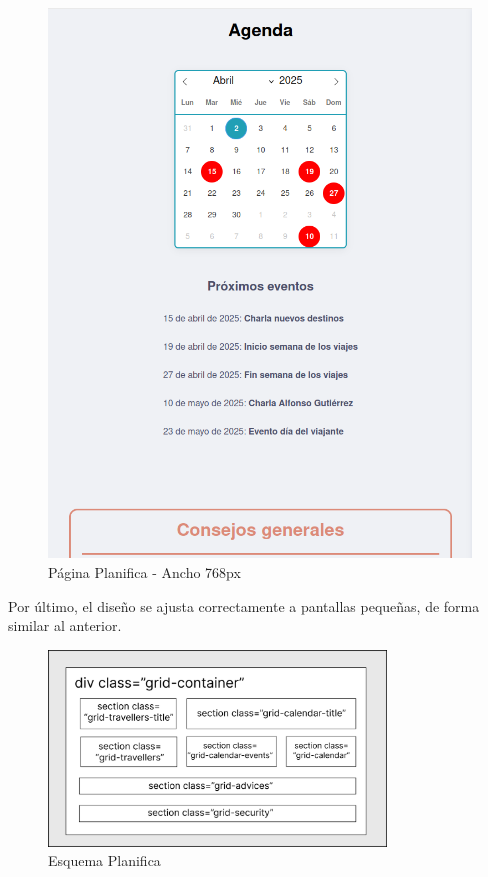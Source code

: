 \documentclass[11pt, a4paper]{book}
\begin{document}
	\begin{figure} [H]
		\centering
		\includegraphics[height=0.4\textheight]{CSS/2-6 768.png}
		\caption{Página Planifica - Ancho 768px}
	\end{figure}

	Por último, el diseño se ajusta correctamente a pantallas pequeñas, de forma similar al anterior. 
	
	\begin{figure} [H]
		\centering
		\includegraphics[width=0.8\textwidth]{CSS/CSS Planifica.jpg}
		\caption{Esquema Planifica}
	\end{figure}
\end{document}
